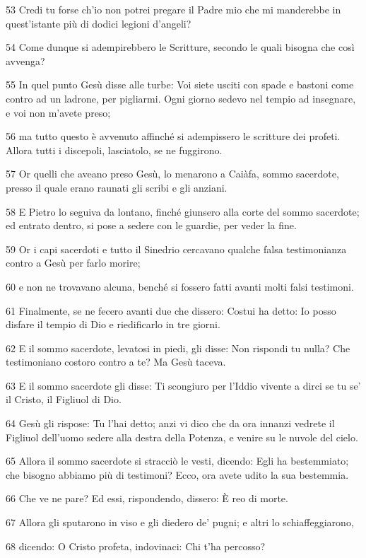 \par 53 Credi tu forse ch'io non potrei pregare il Padre mio che mi manderebbe in quest'istante più di dodici legioni d'angeli?
\par 54 Come dunque si adempirebbero le Scritture, secondo le quali bisogna che così avvenga?
\par 55 In quel punto Gesù disse alle turbe: Voi siete usciti con spade e bastoni come contro ad un ladrone, per pigliarmi. Ogni giorno sedevo nel tempio ad insegnare, e voi non m'avete preso;
\par 56 ma tutto questo è avvenuto affinché si adempissero le scritture dei profeti. Allora tutti i discepoli, lasciatolo, se ne fuggirono.
\par 57 Or quelli che aveano preso Gesù, lo menarono a Caiàfa, sommo sacerdote, presso il quale erano raunati gli scribi e gli anziani.
\par 58 E Pietro lo seguiva da lontano, finché giunsero alla corte del sommo sacerdote; ed entrato dentro, si pose a sedere con le guardie, per veder la fine.
\par 59 Or i capi sacerdoti e tutto il Sinedrio cercavano qualche falsa testimonianza contro a Gesù per farlo morire;
\par 60 e non ne trovavano alcuna, benché si fossero fatti avanti molti falsi testimoni.
\par 61 Finalmente, se ne fecero avanti due che dissero: Costui ha detto: Io posso disfare il tempio di Dio e riedificarlo in tre giorni.
\par 62 E il sommo sacerdote, levatosi in piedi, gli disse: Non rispondi tu nulla? Che testimoniano costoro contro a te? Ma Gesù taceva.
\par 63 E il sommo sacerdote gli disse: Ti scongiuro per l'Iddio vivente a dirci se tu se' il Cristo, il Figliuol di Dio.
\par 64 Gesù gli rispose: Tu l'hai detto; anzi vi dico che da ora innanzi vedrete il Figliuol dell'uomo sedere alla destra della Potenza, e venire su le nuvole del cielo.
\par 65 Allora il sommo sacerdote si stracciò le vesti, dicendo: Egli ha bestemmiato; che bisogno abbiamo più di testimoni? Ecco, ora avete udito la sua bestemmia.
\par 66 Che ve ne pare? Ed essi, rispondendo, dissero: È reo di morte.
\par 67 Allora gli sputarono in viso e gli diedero de' pugni; e altri lo schiaffeggiarono,
\par 68 dicendo: O Cristo profeta, indovinaci: Chi t'ha percosso?
